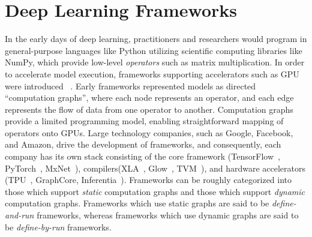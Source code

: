



\section{Deep Learning Frameworks}

In the early days of deep learning, practitioners and researchers would program
  in general-purpose languages like Python utilizing
  scientific computing libraries like NumPy,
  which provide low-level \textit{operators} such as matrix multiplication.
In order to accelerate model execution,
    frameworks supporting accelerators such as GPU were introduced~\citep{theano} .
Early frameworks represented models as directed ``computation graphs'',
    where each node represents an operator,
    and each edge represents the flow of data from one operator to another.
Computation graphs provide a limited programming model,
    enabling straightforward mapping of operators onto GPUs.
Large technology companies,
    such as Google, Facebook, and Amazon,
    drive the development of frameworks,
    and consequently,
    each company has its own stack consisting
    of the core framework (TensorFlow~\citep{tensorflow}, PyTorch~\citep{pytorch}, MxNet~\citep{mxnet}),
    compilers(XLA~\citep{xla}, Glow~\citep{glow}, TVM~\citep{tvm_osdi18}),
    and hardware accelerators (TPU~\citep{tpuv1}, GraphCore, Inferentia~\citep{inferentia}).
Frameworks can be roughly categorized into those which support \textit{static} computation graphs
  and those which support \textit{dynamic} computation graphs.
Frameworks which use static graphs are said to be \textit{define-and-run} frameworks,
  whereas frameworks which use dynamic graphs are said to be \textit{define-by-run} frameworks.

